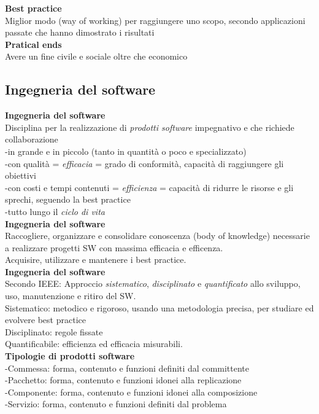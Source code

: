 \documentclass{article}
\begin{document}
		\textbf{Best practice}\\
		Miglior modo (way of working) per raggiungere uno scopo, secondo applicazioni passate che hanno dimostrato i risultati\\
		
		\textbf{Pratical ends}\\
		Avere un fine civile e sociale oltre che economico\\
		
	\subsection{Ingegneria del software}
		\textbf{Ingegneria del software}\\
		Disciplina per la realizzazione di \textit{prodotti software} impegnativo e che richiede collaborazione\\
		-in grande e in piccolo (tanto in quantità o poco e specializzato)\\
		-con qualità = \textit{efficacia} = grado di conformità, capacità di raggiungere gli obiettivi\\
		-con costi e tempi contenuti = \textit{efficienza} = capacità di ridurre le risorse e gli sprechi, seguendo la best practice \\
		-tutto lungo il \textit{ciclo di vita}\\
		
		\textbf{Ingegneria del software}\\
		Raccogliere, organizzare e consolidare conoscenza (body of knowledge) necessarie a realizzare progetti SW con massima efficacia e efficenza.\\
		Acquisire, utilizzare e mantenere i best practice.\\
		
		
		\textbf{Ingegneria del software}\\
		Secondo IEEE: Approccio \textit{sistematico}, \textit{disciplinato} e \textit{quantificato} allo sviluppo, uso, manutenzione e ritiro del SW.\\
		Sistematico: metodico e rigoroso, usando una metodologia precisa, per studiare ed evolvere best practice\\
		Disciplinato: regole fissate\\
		Quantificabile: efficienza ed efficacia misurabili.\\
		
		
		\textbf{Tipologie di prodotti software}\\
		-Commessa: forma, contenuto e funzioni definiti dal committente\\
		-Pacchetto: forma, contenuto e funzioni idonei alla replicazione\\
		-Componente: forma, contenuto e funzioni idonei alla composizione\\
		-Servizio: forma, contenuto e funzioni definiti dal problema\\
		
\end{document}
